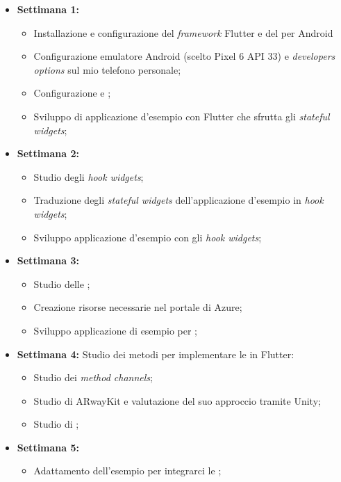 \begin{itemize}
  \item \textbf{Settimana 1:} 
      \begin{itemize}
          \item Installazione e configurazione del \textit{framework} Flutter e del \sdk{} per Android 
          \item Configurazione emulatore Android (scelto Pixel 6 API 33) e 
          \textit{developers options} sul mio telefono personale;
          \item Configurazione \vsc{} e \astudio;
          \item Sviluppo di applicazione d'esempio con Flutter che sfrutta gli \textit{stateful widgets};
      \end{itemize} 
  \item \textbf{Settimana 2:} 
      \begin{itemize}
          \item Studio degli \textit{hook widgets};
          \item Traduzione degli \textit{stateful widgets} dell'applicazione d'esempio in \textit{hook widgets};
          \item Sviluppo applicazione d'esempio con gli \textit{hook widgets};
      \end{itemize}
  \item \textbf{Settimana 3:} 
      \begin{itemize}
          \item Studio delle \asa;
          \item Creazione risorse necessarie nel portale di Azure;
          \item Sviluppo applicazione di esempio per \asa{};
      \end{itemize}
  \item \textbf{Settimana 4:} Studio dei metodi per implementare le \asa{} in Flutter:
      \begin{itemize}
          \item Studio dei \textit{method channels};
          \item Studio di ARwayKit e valutazione del suo approccio tramite Unity;
          \item Studio di \aplug;
      \end{itemize}
  \item \textbf{Settimana 5:} 
      \begin{itemize}
          \item Adattamento dell'esempio \aplug{} per integrarci le \asa{};

\end{itemize}
\end{itemize}
